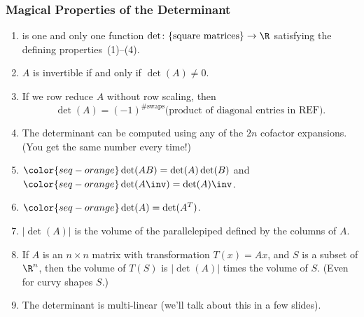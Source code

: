 \begin{frame}
\frametitle{Magical Properties of the Determinant}

\begin{enumerate}
\item {} is one and only one function
  $\det\colon\{\text{square matrices}\}\to\R$ satisfying the defining
  properties~(1)--(4).
\pause\smallskip
\item $A$ is invertible if and only if $\det(A) \neq 0$.
\pause\smallskip
\item If we row reduce $A$ without row scaling, then
  \[ \det(A) = (-1)^{\text{\#swaps}}
  \bigl( \text{product of diagonal entries in REF} \bigr). \]
\pause\null\vskip -9mm\null
\item The determinant can be computed using any of the $2n$ cofactor expansions.
  (You get the same number every time!)
\pause\smallskip
\item $\color{seq-orange}\det(AB) = \det(A)\det(B)$ \quad and \quad
  $\color{seq-orange}\det(A\inv) = \det(A)\inv$.
\pause\smallskip
\item $\color{seq-orange}\det(A) = \det(A^T)$.
\pause\smallskip
\item $|\det(A)|$ is the volume of the parallelepiped defined by the columns of
  $A$.
\pause\smallskip
\item If $A$ is an $n\times n$ matrix with transformation $T(x)=Ax$, and $S$ is a
  subset of $\R^n$, then the volume of $T(S)$ is $|\det(A)|$ times the volume of
  $S$.  (Even for curvy shapes $S$.)
\pause\smallskip
\item The determinant is multi-linear (we'll talk about this in a few slides).
\end{enumerate}
\pause
{}

\end{frame}



